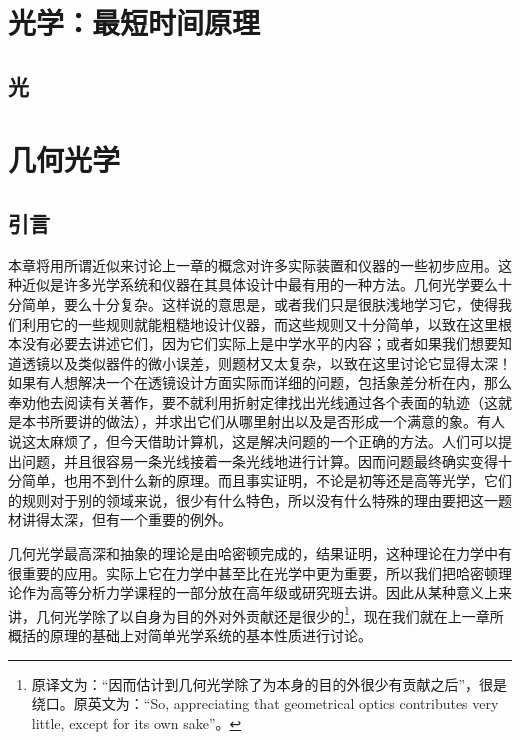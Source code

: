 \documentclass[11pt,oneside]{book}
\begin{document}
\begin{common-format}
\mainmatter

\setcounter{chapter}{25}

\chapter{光学：最短时间原理}

\section{光}


\chapter{几何光学}

\section{引言}
本章将用所谓近似来讨论上一章的概念对许多实际装置和仪器的一些初步应用。这种近似是许多光学系统和仪器在其具体设计中最有用的一种方法。几何光学要么十分简单，要么十分复杂。这样说的意思是，或者我们只是很肤浅地学习它，使得我们利用它的一些规则就能粗糙地设计仪器，而这些规则又十分简单，以致在这里根本没有必要去讲述它们，因为它们实际上是中学水平的内容；或者如果我们想要知道透镜以及类似器件的微小误差，则题材又太复杂，以致在这里讨论它显得太深！如果有人想解决一个在透镜设计方面实际而详细的问题，包括象差分析在内，那么奉劝他去阅读有关著作，要不就利用折射定律找出光线通过各个表面的轨迹（这就是本书所要讲的做法），并求出它们从哪里射出以及是否形成一个满意的象。有人说这太麻烦了，但今天借助计算机，这是解决问题的一个正确的方法。人们可以提出问题，并且很容易一条光线接着一条光线地进行计算。因而问题最终确实变得十分简单，也用不到什么新的原理。而且事实证明，不论是初等还是高等光学，它们的规则对于别的领域来说，很少有什么特色，所以没有什么特殊的理由要把这一题材讲得太深，但有一个重要的例外。

几何光学最高深和抽象的理论是由哈密顿完成的，结果证明，这种理论在力学中有很重要的应用。实际上它在力学中甚至比在光学中更为重要，所以我们把哈密顿理论作为高等分析力学课程的一部分放在高年级或研究班去讲。因此从某种意义上来讲，几何光学除了以自身为目的外对外贡献还是很少的\footnote{原译文为：“因而估计到几何光学除了为本身的目的外很少有贡献之后”，很是绕口。原英文为：“So, appreciating that geometrical optics contributes very little, except for its own sake”。}，现在我们就在上一章所概括的原理的基础上对简单光学系统的基本性质进行讨论。


\end{common-format}
\end{document}
